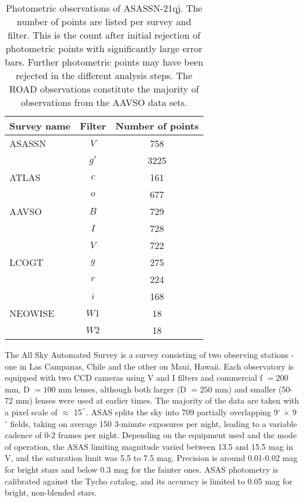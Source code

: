 \documentclass[sn-nature,oneside]{sn-jnl}%
\newcommand*\degr{\ensuremath{^\circ}}
\newcommand*\arcsec{\ensuremath{^{\prime\prime}}}   %
\begin{document}
\begin{table}
    \centering
    \caption{Photometric observations of ASASSN-21qj. The number of points are listed per survey and filter. %
    This is the count after initial rejection of photometric points with significantly large error bars.
    Further photometric points may have been rejected in the different analysis steps.
    The ROAD observations constitute the majority of observations from the AAVSO data sets.}
    \begin{tabular}{@{}lcc@{}}
    \hline\hline
Survey name  & Filter & Number of points                    \\
        \hline
ASASSN   &  $V$   & 758 \\
   &  $g'$   & 3225 \\
        \hline
ATLAS & $c$ & 161 \\
 & $o$ & 677 \\
        \hline
AAVSO   &  $B$   & 729 \\    %
   &  $I$   & 728 \\    %
   &  $V$   & 722 \\    %
        \hline
LCOGT   &  $g$   & 275 \\    %
   &  $r$   & 224 \\    %
   &  $i$   & 168 \\    %
        \hline
NEOWISE & $W1$ & 18 \\
 & $W2$ & 18 \\
        \hline
    \end{tabular}
 
\label{tab:photometry}
\end{table}

%
%
The All Sky Automated Survey \cite[ASAS; ][]{pojmanski_all_1997, asas_2005, asas_2018} is a survey consisting of two observing stations - one in Las Campanas, Chile and the other on Maui, Hawaii. 
%
Each observatory is equipped with two CCD cameras using V and I filters and commercial f $ = 200$ mm, D $= 100$ mm lenses, although both larger (D $=250$ mm) and smaller (50-72 mm) lenses were used at earlier times.
%
The majority of the data are taken with a pixel scale of $\approx$ 15\arcsec{}.
%
ASAS splits the sky into 709 partially overlapping 9\degr{} $\times$ 9\degr{} fields, taking on average 150 3-minute exposures per night, leading to a variable cadence of 0-2 frames per night.
%
Depending on the equipment used and the mode of operation, the ASAS limiting magnitude varied between 13.5 and 15.5 mag in V, and the saturation limit was 5.5 to 7.5 mag. 
%
Precision is around 0.01-0.02 mag for bright stars and below 0.3 mag for the fainter ones. 
%
ASAS photometry is calibrated against the Tycho catalog, and its accuracy is limited to 0.05 mag for bright, non-blended stars.
\end{document}
